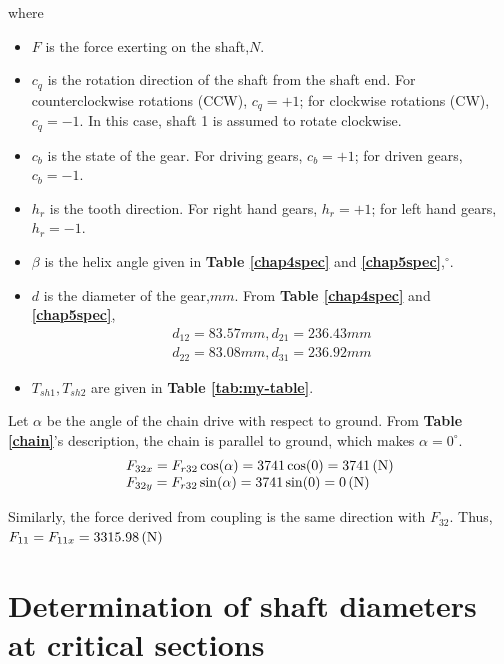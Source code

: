 where
\begin{itemize}
	\item $ F $ is the force exerting on the shaft,$ \unit{N} $.
	\item $ c_q $ is the rotation direction of the shaft from the shaft end. For counterclockwise rotations (CCW), $ c_q=+1 $; for clockwise rotations (CW), $ c_q=-1 $. In this case, shaft 1 is assumed to rotate clockwise.
	\item $ c_b $ is the state of the gear. For driving gears, $ c_b=+1 $; for driven gears, $ c_b=-1 $.
	\item $ h_r $ is the tooth direction. For right hand gears, $ h_r= +1$; for left hand gears, $ h_r=-1 $.
	\item $ \beta $ is the helix angle given in \textbf{Table \ref{chap4spec}} and \textbf{\ref{chap5spec}},$ ^\circ $.
	\item $ d $ is the diameter of the gear,$ \unit{mm} $. From \textbf{Table \ref{chap4spec}} and \textbf{\ref{chap5spec}},
	\[
	\begin{array}{l}
	d_{12}=83.57\unit{mm},d_{21}=236.43\unit{mm}\\
	d_{22}=83.08\unit{mm},d_{31}=236.92\unit{mm}
	\end{array}
	\]
	\item $ T_{sh1},T_{sh2} $ are given in \textbf{Table \ref{tab:my-table}}.
\end{itemize}

Let $ \alpha $ be the angle of the chain drive with respect to ground. From \textbf{Table \ref{chain}}'s description, the chain is parallel to ground, which makes $ \alpha = 0^\circ $.
\[
\begin{array}{l}
F_{32x} = F_{r32}\cos(\alpha) = 3741\cos(0) = 3741 \, (\mathrm{N})\\
F_{32y} = F_{r32}\sin(\alpha) = 3741\sin(0) = 0 \, (\mathrm{N})\\
\end{array}
\]

Similarly, the force derived from coupling is the same direction with $ F_{32} $. Thus, $ F_{11} = F_{11x} = 3315.98 \, (\mathrm{N}) $

\section{Determination of shaft diameters at critical sections}
